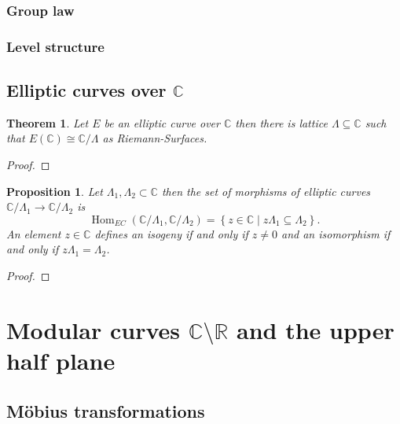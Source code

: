 \documentclass[a4paper,12pt,reqno]{amsart}
\newcommand{\set}[1]{\left\lbrace #1 \right\rbrace}
\newcommand{\field}[1]{\mathbb{#1}}  %
\newcommand{\R}{\field{R}} %
\newcommand{\C}{\field{C}} %
\DeclareMathOperator{\Hom}{Hom}
\newtheorem{theorem}[lemma]{Theorem}
\newtheorem{proposition}[lemma]{Proposition}
\theoremstyle{definition}
\numberwithin{lemma}{section}
\numberwithin{equation}{section}
\numberwithin{figure}{section}
\begin{document}


\subsubsection{Group law}

\subsubsection{Level structure}


\subsection{Elliptic curves over $\C$}
\begin{theorem}\label{stmt:complex-ec-is-C-mod-lattice}
	Let $E$ be an elliptic curve over $\C$ then there is lattice $\Lambda \subseteq \C$ such that $E(\C) \cong \C/\Lambda$ as Riemann-Surfaces.
\end{theorem}
\begin{proof}
\end{proof}

\begin{proposition}
	Let $\Lambda_1, \Lambda_2 \subset \C$ then the set of morphisms of elliptic curves $\C/\Lambda_1 \to \C/\Lambda_2$ is $$\Hom_{EC}(\C/\Lambda_1,\C/\Lambda_2) =\set{z \in \C \mid z\Lambda_1 \subseteq \Lambda_2}.$$ 
	An element $z \in \C$ defines an isogeny if and only if $z \neq 0$ and an isomorphism if and only if $z\Lambda_1 = \Lambda_2$.
\end{proposition}
\begin{proof}
\end{proof}

\section{Modular curves $\C\setminus \R$ and the upper half plane}



\subsection{M\"obius transformations}
\end{document}
